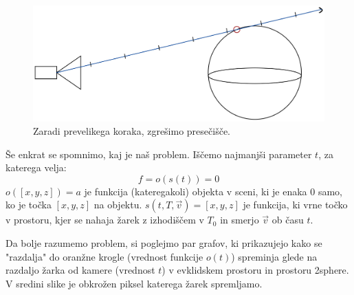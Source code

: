 \documentclass[titlepage]{article}
\begin{document}
\begin{figure} [H]
  \centering
  \includegraphics[width=0.6\linewidth]{Images/step_size_issue.png}
  \caption{Zaradi prevelikega koraka, zgrešimo presečišče.}
  \label{fig:step_size_issue}
\end{figure}

Še enkrat se spomnimo, kaj je naš problem. Iščemo najmanjši parameter \( t \), za katerega velja:
\[ f = o(s(t)) = 0 \]
\( o([x, y, z]) = a \) je funkcija (kateregakoli) objekta v sceni, ki je enaka 0 samo, ko je 
točka \([x, y, z]\) na objektu. 
\( s(t, T, \vec{v}) = [x, y, z] \) je funkcija, ki vrne točko v prostoru, kjer se nahaja žarek z izhodiščem v \( T_0\) in smerjo 
\( \vec{v} \) ob času \( t \).


Da bolje razumemo problem, si poglejmo par grafov, ki prikazujejo kako se 
"razdalja" do oranžne krogle (vrednost funkcije \( o(t) \)) spreminja glede na razdaljo žarka od 
kamere (vrednost \( t \)) v evklidskem prostoru in prostoru 2sphere. V sredini slike je obkrožen piksel katerega žarek spremljamo.
\end{document}
